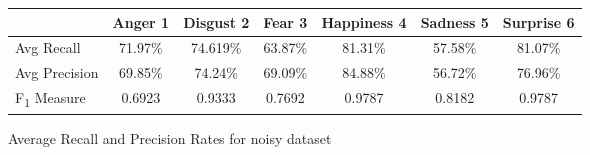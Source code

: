 \begin{figure}[h]
\begin{center}
\caption{Average Recall and Precision Rates for noisy dataset}
\begin{tabular}{ | l || c | c | c | c | c | c | }
    \hline
          & Anger 1 & Disgust 2 & Fear 3 & Happiness 4 & Sadness 5 & Surprise 6 \\ \hline \hline
        Avg Recall & 71.97\% & 74.619\% & 63.87\% & 81.31\% & 57.58\% & 81.07\% \\ \hline
        Avg Precision & 69.85\% & 74.24\% & 69.09\%  & 84.88\% & 56.72\% & 76.96\% \\ \hline
        F\textsubscript{1} Measure & 0.6923 & 0.9333 & 0.7692 & 0.9787 & 0.8182 &
        0.9787 \\ \hline
    \end{tabular}
    \label{fig:averageRecall}
\end{center}
\end{figure}
